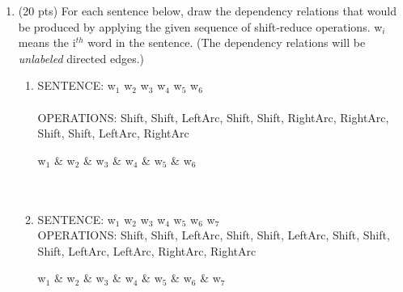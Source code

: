 \documentclass[11pt]{article}
\begin{document}
\begin{enumerate}
\newpage
\item (20 pts) For each sentence below, draw the dependency relations
  that would be produced by applying the given sequence of
  shift-reduce operations. w$_{i}$ means the i$^{th}$ word in the
  sentence. (The dependency relations will be {\it unlabeled} directed
  edges.)
  \\
	
	\begin{enumerate}
		\item
		SENTENCE: w$_{1}$ w$_{2}$ w$_{3}$ w$_{4}$ w$_{5}$ w$_{6}$ \\\\
		OPERATIONS: Shift, Shift, LeftArc, Shift, Shift, RightArc, RightArc, Shift, Shift, LeftArc, RightArc \\
		
	\begin{dependency}[edge slant=15pt,label theme = simple, edge theme = iron]
  	\begin{deptext}[column sep=2em]
    		w$_{1}$ \& w$_{2}$ \& w$_{3}$ \& w$_{4}$ \& w$_{5}$ \& w$_{6}$ \\ \\ \\
  	\end{deptext}
	\end{dependency}

		\vspace{.5in}
	
		\item
		SENTENCE: w$_{1}$ w$_{2}$ w$_{3}$ w$_{4}$ w$_{5}$ w$_{6}$ w$_{7}$ \\
		
		OPERATIONS: Shift, Shift, LeftArc, Shift, Shift, LeftArc, Shift, Shift, Shift, LeftArc, LeftArc, RightArc, RightArc\\

	\begin{dependency}[edge slant=15pt,label theme = simple, edge theme = iron]
  	\begin{deptext}[column sep=2em]
    		w$_{1}$ \& w$_{2}$ \& w$_{3}$ \& w$_{4}$ \& w$_{5}$ \& w$_{6}$ \& w$_{7}$\\ \\ \\
  	\end{deptext}
	\end{dependency}
	

\end{enumerate}
\end{enumerate}
\end{document}
